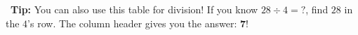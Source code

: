 {\vspace{3mm}

\begin{tcolorbox}[
    enhanced,
    colback=funCream,
    colframe=funYellow!60,
    arc=10pt, boxrule=1pt,
    left=5mm, right=5mm, top=3mm, bottom=3mm,
    halign=center,
]
    \textcolor{funOrange}{\faInfoCircle}~\textbf{Tip:} You can also use this table for
    division! If you know $28 \div 4 = ?$, find $28$ in the $4$'s row.
    The column header gives you the answer: $\mathbf{7}$!
\end{tcolorbox}

}

\newpage
